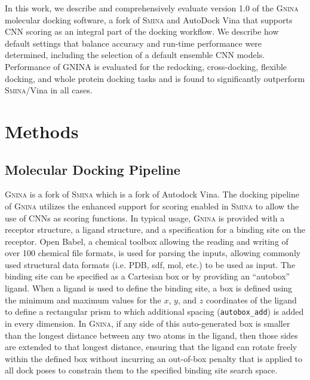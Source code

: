 \documentclass[journal=jcisd8,manuscript=article]{achemso}
\begin{document}
In this work, we describe and comprehensively evaluate version 1.0 of the \textsc{Gnina} molecular docking software, a fork of \textsc{Smina}\cite{koes2013lessons} and AutoDock Vina\cite{trott2010autodock} that supports CNN scoring as an integral part of the docking workflow. We describe how default settings that balance accuracy and run-time performance were determined, including the selection of a default ensemble CNN models. Performance of \textsc{GNINA} is evaluated for the redocking, cross-docking, flexible docking, and whole protein docking tasks and is found to significantly outperform \textsc{Smina}/Vina in all cases.



\section{Methods}

\subsection{Molecular Docking Pipeline}
\textsc{\textsc{Gnina}} is a fork of \textsc{Smina} which is a fork of Autodock Vina. The docking pipeline of \textsc{\textsc{Gnina}} utilizes the enhanced support for scoring enabled in \textsc{Smina} to allow the use of CNNs as scoring functions. In typical usage, \textsc{\textsc{Gnina}} is provided with a receptor structure, a ligand structure, and a specification for a binding site on the receptor. Open Babel\cite{o2011open,babelopen}, a chemical toolbox allowing the reading and writing of over 100 chemical file formats, is used for parsing the inputs, allowing commonly used structural data formats (i.e. PDB, sdf, mol, etc.) to be used as input. The binding site can be specified as a Cartesian box or by providing an ``autobox'' ligand.  When a ligand is used to define the binding site, a box is defined using the minimum and maximum values for the $x$, $y$, and $z$ coordinates of the ligand to define a rectangular prism to which additional spacing (\texttt{autobox\_add}) is added in every dimension.    In \textsc{Gnina}, if any side of this auto-generated box is smaller than the longest distance between any two atoms in the ligand, then those sides are extended to that longest distance, ensuring that the ligand can rotate freely within the defined box without incurring an out-of-box penalty that is applied to all dock poses to constrain them to the specified binding site search space.
\end{document}
